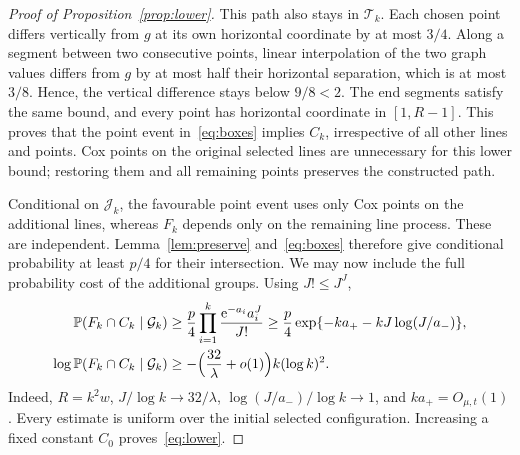 \documentclass[11pt,letterpaper]{article}
\begin{document}
\begin{proof}[Proof of Proposition~\ref{prop:lower}]
This path also stays in $\mathcal T_k$. Each chosen point differs vertically from $g$ at its own horizontal coordinate by at most $3/4$. Along a segment between two consecutive points, linear interpolation of the two graph values differs from $g$ by at most half their horizontal separation, which is at most $3/8$. Hence, the vertical difference stays below $9/8<2$. The end segments satisfy the same bound, and every point has horizontal coordinate in $[1,R-1]$. This proves that the point event in~\eqref{eq:boxes} implies $C_k$, irrespective of all other lines and points. Cox points on the original selected lines are unnecessary for this lower bound; restoring them and all remaining points preserves the constructed path.

Conditional on $\mathcal J_k$, the favourable point event uses only Cox points on the additional lines, whereas $F_k$ depends only on the remaining line process. These are independent. Lemma~\ref{lem:preserve} and~\eqref{eq:boxes} therefore give conditional probability at least $p/4$ for their intersection. We may now include the full probability cost of the additional groups. Using $J!\le J^J$,
\begin{equation}\label{eq:lower-cost}
\begin{aligned}
 \mathbb P(F_k\cap C_k\mid\mathcal G_k)
 &\ge\frac p4\prod_{i=1}^k\frac{\mathrm{e}^{-a_i}a_i^J}{J!}
 \ge\frac p4\exp\{-ka_+-kJ\log(J/a_-)\},\\
 \log\mathbb P(F_k\cap C_k\mid\mathcal G_k)
 &\ge-\Big(\frac{32}{\lambda}+o(1)\Big)k(\log k)^2.
\end{aligned}
\end{equation}
Indeed, $R=k^2w$, $J/\log k\to32/\lambda$, $\log(J/a_-)/\log k\to1$, and $ka_+=O_{\mu,t}(1)$. Every estimate is uniform over the initial selected configuration. Increasing a fixed constant $C_0$ proves~\eqref{eq:lower}.
\end{proof}
\end{document}

